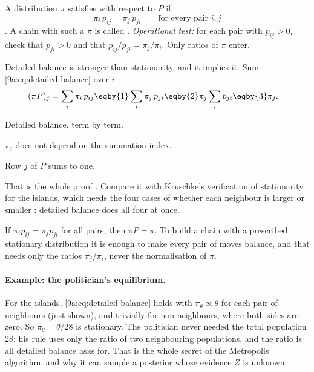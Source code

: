 \begin{workdef}
A distribution $\pi$ satisfies  with respect to $P$ if
\begin{equation}
  \pi_i\,p_{ij}=\pi_j\,p_{ji}\qquad\text{for every pair }i,j
  \label{9a:eq:detailed-balance}
\end{equation}
 . A chain with such a $\pi$ is called
.
\emph{Operational test:} for each pair with $p_{ij}>0$, check that $p_{ji}>0$ and that
$p_{ij}/p_{ji}=\pi_j/\pi_i$. Only ratios of $\pi$ enter.
\end{workdef}

Detailed balance is stronger than stationarity, and it implies it. Sum
\eqref{9a:eq:detailed-balance} over $i$:
\begin{align}
  (\pi P)_j=\sum_i\pi_i\,p_{ij}
  &\eqby{1}\sum_i\pi_j\,p_{ji}
   \eqby{2}\pi_j\sum_ip_{ji}
   \eqby{3}\pi_j .
  \label{9a:eq:db-implies}
\end{align}
\begin{explain}
  \item Detailed balance, term by term.
  \item $\pi_j$ does not depend on the summation index.
  \item Row $j$ of $P$ sums to one.
\end{explain}
That is the whole proof . Compare it with Kruschke's verification of
stationarity for the islands, which needs the four cases of whether each neighbour is larger
or smaller : detailed balance does all four at once.

\begin{keyidea}
If $\pi_ip_{ij}=\pi_jp_{ji}$ for all pairs, then $\pi P=\pi$. To build a chain with a
prescribed stationary distribution it is enough to make every pair of moves balance, and that
needs only the ratios $\pi_j/\pi_i$, never the normalisation of $\pi$.
\end{keyidea}

\paragraph{Example: the politician's equilibrium.}
For the islands, \eqref{9a:eq:detailed-balance} holds with $\pi_\theta\propto\theta$ for each
pair of neighbours (just shown), and trivially for non-neighbours, where both sides are zero.
So $\pi_\theta=\theta/28$ is stationary. The politician never needed the total population 28:
his rule uses only the ratio of two neighbouring populations, and the ratio is all detailed
balance asks for. That is the whole secret of the Metropolis algorithm, and why it can sample a
posterior whose evidence $Z$ is unknown \cite{Metropolis1953,Hastings1970}.

